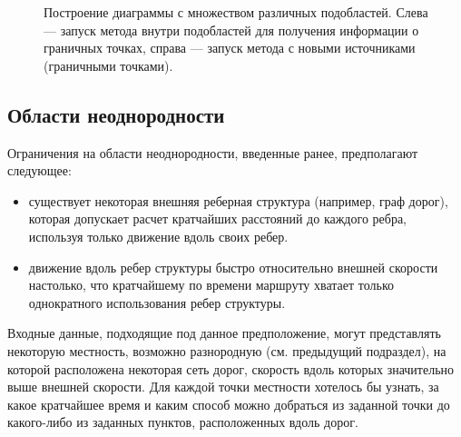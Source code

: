 \documentclass[12pt]{article}
\begin{document}
\begin{figure}
\begin{center}
\end{center}
\caption{Построение диаграммы с множеством различных подобластей. 
Слева --- запуск метода внутри подобластей
для получения информации о граничных точках, справа --- запуск метода
с новыми источниками (граничными точками).}
\label{multi_type_fig}
\end{figure}

\subsection{Области неоднородности}
Ограничения на области неоднородности, введенные ранее, предполагают следующее:
\begin{itemize}
\item существует некоторая внешняя реберная структура (например, граф дорог), 
которая допускает расчет кратчайших расстояний до каждого ребра, используя
только движение вдоль своих ребер.
\item движение вдоль ребер структуры быстро относительно внешней скорости 
настолько, что кратчайшему по времени маршруту хватает только однократного использования
ребер структуры.
\end{itemize}
Входные данные, подходящие под данное предположение, могут представлять
некоторую местность, возможно разнородную (см. предыдущий подраздел), на которой
расположена некоторая сеть дорог, скорость вдоль которых
значительно выше внешней скорости. Для каждой точки местности хотелось бы
узнать, за какое кратчайшее время и каким способ можно добраться 
из заданной точки до какого-либо из заданных пунктов, расположенных вдоль дорог.
\end{document}
